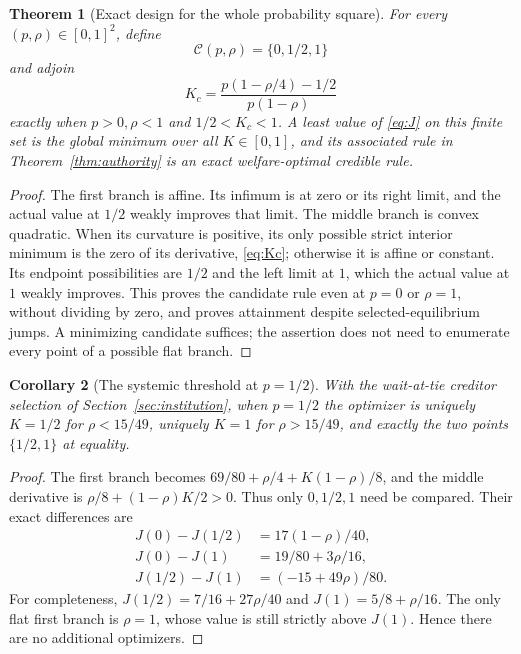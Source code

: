 \documentclass[11pt,a4paper]{article}
\numberwithin{equation}{section}
\newtheorem{theorem}{Theorem}[section]
\newtheorem{corollary}[theorem]{Corollary}
\theoremstyle{definition}
\begin{document}
\begin{theorem}[Exact design for the whole probability square]\label{thm:capital}
For every \((p,\rho)\in[0,1]^2\), define
\[
\mathcal C(p,\rho)=\{0,1/2,1\}
\]
and adjoin
\begin{equation}\label{eq:Kc}
 K_c=\frac{p(1-\rho/4)-1/2}{p(1-\rho)}
\end{equation}
exactly when \(p>0,\rho<1\) and \(1/2<K_c<1\). A least value of
\eqref{eq:J} on this finite set is the global minimum over all
\(K\in[0,1]\), and its associated rule in
Theorem~\ref{thm:authority} is an exact welfare-optimal credible rule.
\end{theorem}
\begin{proof}
The first branch is affine. Its infimum is at zero or its right limit,
and the actual value at \(1/2\) weakly improves that limit. The middle
branch is convex quadratic. When its curvature is positive, its only
possible strict interior minimum is the zero of its derivative,
\eqref{eq:Kc}; otherwise it is affine or constant. Its endpoint
possibilities are \(1/2\) and the left limit at \(1\), which the actual
value at \(1\) weakly improves. This proves the candidate rule even at
\(p=0\) or \(\rho=1\), without dividing by zero, and proves attainment
despite selected-equilibrium jumps. A minimizing candidate suffices;
the assertion does not need to enumerate every point of a possible
flat branch.
\end{proof}

\begin{corollary}[The systemic threshold at \(p=1/2\)]\label{cor:threshold}
With the wait-at-tie creditor selection of Section~\ref{sec:institution},
when \(p=1/2\) the optimizer is uniquely \(K=1/2\) for \(\rho<15/49\),
uniquely \(K=1\) for \(\rho>15/49\), and exactly the two points
\(\{1/2,1\}\) at equality.
\end{corollary}
\begin{proof}
The first branch becomes \(69/80+\rho/4+K(1-\rho)/8\), and the
middle derivative is \(\rho/8+(1-\rho)K/2>0\).
Thus only \(0,1/2,1\) need be compared. Their exact differences are
\[
\begin{aligned}
J(0)-J(1/2)&=17(1-\rho)/40,\\
J(0)-J(1)&=19/80+3\rho/16,\\
J(1/2)-J(1)&=(-15+49\rho)/80.
\end{aligned}
\]
For completeness,
\(J(1/2)=7/16+27\rho/40\) and \(J(1)=5/8+\rho/16\).
The only flat first branch is \(\rho=1\), whose value is still strictly
above \(J(1)\). Hence there are no additional optimizers.
\end{proof}
\end{document}
